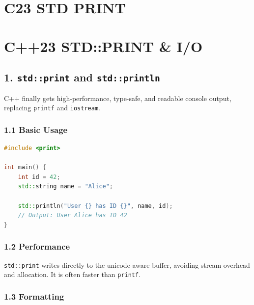 \hypertarget{c23-std-print}{%
\chapter{C23 STD PRINT}\label{c23-std-print}}

\hypertarget{c23-stdprint-io}{%
\chapter{C++23 STD::PRINT \& I/O}\label{c23-stdprint-io}}

\hypertarget{stdprint-and-stdprintln}{%
\section{\texorpdfstring{1. \texttt{std::print} and
\texttt{std::println}}{1. std::print and std::println}}\label{stdprint-and-stdprintln}}

C++ finally gets high-performance, type-safe, and readable console
output, replacing \passthrough{\lstinline!printf!} and
\passthrough{\lstinline!iostream!}.

\hypertarget{basic-usage}{%
\subsection{1.1 Basic Usage}\label{basic-usage}}

\begin{lstlisting}[language={C++}]
#include <print>

int main() {
    int id = 42;
    std::string name = "Alice";
    
    std::println("User {} has ID {}", name, id);
    // Output: User Alice has ID 42
}
\end{lstlisting}

\hypertarget{performance}{%
\subsection{1.2 Performance}\label{performance}}

\passthrough{\lstinline!std::print!} writes directly to the
unicode-aware buffer, avoiding stream overhead and allocation. It is
often faster than \passthrough{\lstinline!printf!}.

\hypertarget{formatting}{%
\subsection{1.3 Formatting}\label{formatting}}

